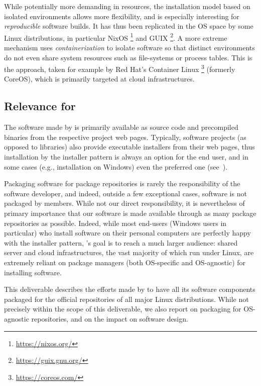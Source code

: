 \documentclass{deliverablereport}
\begin{document}
While potentially more demanding in resources, the installation model
based on isolated environments allows more flexibility, and is
especially interesting for \emph{reproducible} software builds. %
It has thus been replicated in the OS space by some Linux
distributions, in particular NixOS%
\footnote{\url{https://nixos.org/}} %
and GUIX%
\footnote{\url{https://guix.gnu.org/}}. %
A more extreme mechanism uses \emph{containerization} to isolate
software so that distinct environments do not even share system
resources such as file-systems or process tables. %
This is the approach, taken for example by Red Hat's Container Linux%
\footnote{\url{https://coreos.com/}} %
(formerly CoreOS), which is primarily targeted at cloud infrastructures.

\subsection{Relevance for \ODK}

The software made by \ODK is primarily available as source code and
precompiled binaries from the respective project web pages. %
Typically, software projects (as opposed to libraries) also provide
executable installers from their web pages, thus installation by the
installer pattern is always an option for the end user, and in some
cases (e.g., installation on Windows) even the preferred one
(see~).

Packaging software for package repositories is rarely the
responsibility of the software developer, and indeed, outside a few
exceptional cases, \ODK software is not packaged by \ODK members. %
While not our direct responsibility, it is nevertheless of
primary importance that our software is made available through as many
package repositories as possible. %
Indeed, while most end-users (Windows users in particular) who install
software on their personal computers are perfectly happy with the
installer pattern, \ODK's goal is to reach a much larger audience:
shared server and cloud infrastructures, the vast majority of which
run under Linux, are extremely reliant on package managers
(both OS-specific and OS-agnostic) for installing software.

This deliverable describes the efforts made by \ODK to have all its
software components packaged for the official repositories of all
major Linux distributions. %
While not precisely within the scope of this deliverable, we also
report on packaging for OS-agnostic repositories, and on the impact on
software design.
\end{document}
